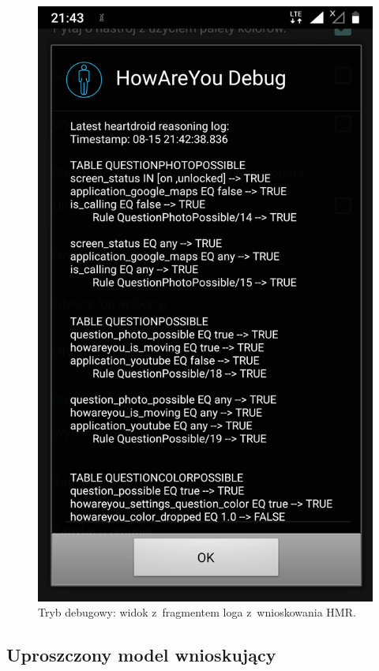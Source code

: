 \begin{figure}[H]
	\centering
	\includegraphics[scale=0.15]{rozdzial4/HMR_screenshots_A.png}
	\caption{Tryb debugowy: widok z~fragmentem loga z~wnioskowania HMR.}
\end{figure}



\subsection{Uproszczony model wnioskujący}


